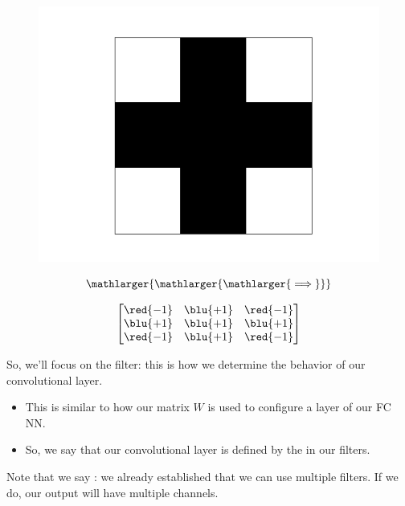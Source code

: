         \begin{figure}[ht]
            \begin{minipage}{.35\textwidth}
              \centering
              \includegraphics[width=.6\linewidth]{images/convolutional_neural_networks_images/crossgrid.png} 
            \end{minipage}
            \begin{minipage}{.3\textwidth}
                \centering
                $$\mathlarger{\mathlarger{\mathlarger{\implies}}}$$
            \end{minipage}
            \begin{minipage}{.1\textwidth}
                \centering
              \[
              \begin{bmatrix}
                  \red{-1} & \blu{+1} & \red{-1} \\
                  \blu{+1} & \blu{+1} & \blu{+1} \\
                  \red{-1} & \blu{+1} & \red{-1}
              \end{bmatrix}
              \]
            \end{minipage}
        \end{figure}

        So, we'll focus on the filter: this is how we determine the behavior of our convolutional layer.

        \begin{itemize}
            \item This is similar to how our  matrix $W$ is used to configure a layer of our FC NN.
            \item So, we say that our convolutional layer is defined by the  in our filters.
        \end{itemize}

        Note that we say : we already established that we can use multiple filters. If we do, our output will have multiple channels.\\

